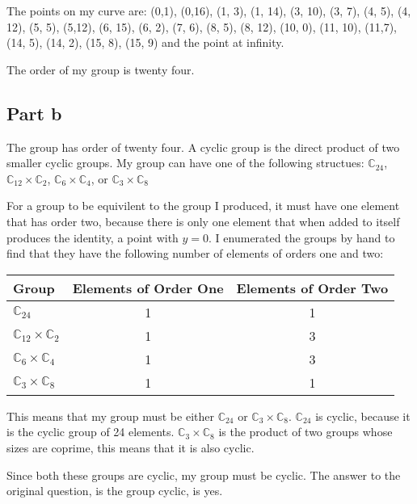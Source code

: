 \documentclass[11pt,a4paper,twoside]{article}
\begin{document}
The points on my curve are: (0,1), (0,16), (1, 3), (1, 14), (3, 10), (3, 7),
(4, 5), (4, 12), (5, 5), (5,12), (6, 15), (6, 2), (7, 6), (8, 5), (8, 12), (10,
0), (11, 10), (11,7), (14, 5), (14, 2), (15, 8), (15, 9) and the point at
infinity. 

The order of my group is twenty four. 

\subsection{Part b}
The group has order of twenty four. A cyclic group is the direct product of two
smaller cyclic groups. My group can have one of the following structues:
$\mathbb{C}_{24}$, $\mathbb{C}_{12}\times\mathbb{C}_{2}$,
$\mathbb{C}_{6}\times\mathbb{C}_{4}$, or $\mathbb{C}_{3}\times\mathbb{C}_{8}$

For a group to be equivilent to the group I produced, it must have one element
that has order two, because there is only one element that when added to itself
produces the identity, a point with $y = 0$. I enumerated the groups by hand to find that they
have the following number of elements of orders one and two: 

\begin{table}[H]
\centering
\begin{tabular}{l@{}cc}
Group                                 & Elements of Order One & Elements of Order Two \\  \midrule
$\mathbb{C}_{24}$                     & 1                     & 1                     \\
$\mathbb{C}_{12}\times\mathbb{C}_{2}$ & 1                     & 3                     \\
$\mathbb{C}_{6}\times\mathbb{C}_{4}$  & 1                     & 3                     \\
$\mathbb{C}_{3}\times\mathbb{C}_{8}$  & 1                     & 1                     
\end{tabular}
\end{table}

This means that my group must be either $\mathbb{C}_{24}$ or
$\mathbb{C}_{3}\times\mathbb{C}_{8}$. $\mathbb{C}_{24}$ is cyclic, because it
is the cyclic group of 24 elements. $\mathbb{C}_{3}\times\mathbb{C}_{8}$ is the
product of two groups whose sizes are coprime, this means that it is also cyclic.

Since both these groups are cyclic, my group must be cyclic. The answer to the
original question, is the group cyclic, is yes. 
\end{document}
